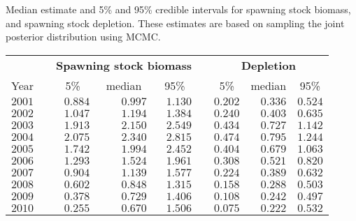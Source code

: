 %
\begin{tablehere}
 \caption{Median estimate and 5\% and 95\% credible 
					intervals for spawning stock biomass, and spawning 
					stock depletion. These estimates are based on sampling the
						joint posterior distribution using MCMC.\label{iscam.T1}} 
 \begin{center}
 \begin{tabular}{rcrrrcrrr}\hline\hline
\multicolumn{1}{c}{\bfseries  }&
\multicolumn{1}{c}{\bfseries }&
\multicolumn{3}{c}{\bfseries Spawning stock biomass}&
\multicolumn{1}{c}{\bfseries }&
\multicolumn{3}{c}{\bfseries Depletion}
\tabularnewline \cline{1-9}
\multicolumn{1}{c}{Year}&\multicolumn{1}{c}{}&\multicolumn{1}{c}{5\%}&\multicolumn{1}{c}{median}&\multicolumn{1}{c}{95\%}&\multicolumn{1}{c}{}&\multicolumn{1}{c}{5\%}&\multicolumn{1}{c}{median}&\multicolumn{1}{c}{95\%}\tabularnewline
\hline
$2001$&&$0.884$&$0.997$&$1.130$&&$0.202$&$0.336$&$0.524$\tabularnewline
$2002$&&$1.047$&$1.194$&$1.384$&&$0.240$&$0.403$&$0.635$\tabularnewline
$2003$&&$1.913$&$2.150$&$2.549$&&$0.434$&$0.727$&$1.142$\tabularnewline
$2004$&&$2.075$&$2.340$&$2.815$&&$0.474$&$0.795$&$1.244$\tabularnewline
$2005$&&$1.742$&$1.994$&$2.452$&&$0.404$&$0.679$&$1.063$\tabularnewline
$2006$&&$1.293$&$1.524$&$1.961$&&$0.308$&$0.521$&$0.820$\tabularnewline
$2007$&&$0.904$&$1.139$&$1.577$&&$0.224$&$0.389$&$0.632$\tabularnewline
$2008$&&$0.602$&$0.848$&$1.315$&&$0.158$&$0.288$&$0.503$\tabularnewline
$2009$&&$0.378$&$0.729$&$1.406$&&$0.108$&$0.242$&$0.497$\tabularnewline
$2010$&&$0.255$&$0.670$&$1.506$&&$0.075$&$0.222$&$0.532$\tabularnewline
\hline
\end{tabular}

\end{center}

\end{tablehere}

